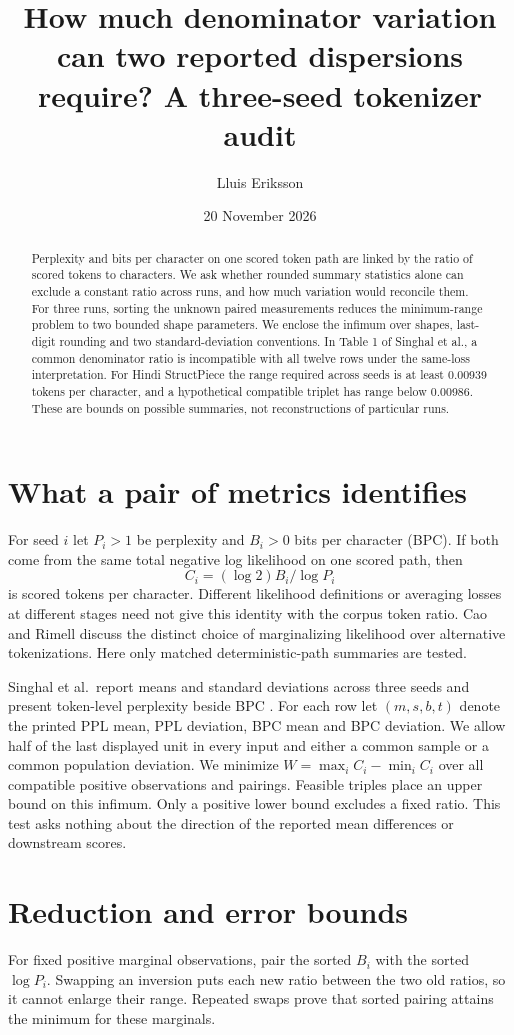 \documentclass[11pt]{article}
\title{How much denominator variation can two reported dispersions require? A three-seed tokenizer audit}
\author{Lluis Eriksson}\date{20 November 2026}
\begin{document}
\maketitle
\begin{abstract}
Perplexity and bits per character on one scored token path are linked by the ratio of scored tokens to characters. We ask whether rounded summary statistics alone can exclude a constant ratio across runs, and how much variation would reconcile them. For three runs, sorting the unknown paired measurements reduces the minimum-range problem to two bounded shape parameters. We enclose the infimum over shapes, last-digit rounding and two standard-deviation conventions. In Table 1 of Singhal et al., a common denominator ratio is incompatible with all twelve rows under the same-loss interpretation. For Hindi StructPiece the range required across seeds is at least 0.00939 tokens per character, and a hypothetical compatible triplet has range below 0.00986. These are bounds on possible summaries, not reconstructions of particular runs.
\end{abstract}
\section{What a pair of metrics identifies}
For seed $i$ let $P_i>1$ be perplexity and $B_i>0$ bits per character (BPC). If both come from the same total negative log likelihood on one scored path, then
\[
  C_i=(\log 2)B_i/\log P_i
\]
is scored tokens per character. Different likelihood definitions or averaging losses at different stages need not give this identity with the corpus token ratio. Cao and Rimell \cite{cao} discuss the distinct choice of marginalizing likelihood over alternative tokenizations. Here only matched deterministic-path summaries are tested.

Singhal et al.\ report means and standard deviations across three seeds and present token-level perplexity beside BPC \cite{article}. For each row let $(m,s,b,t)$ denote the printed PPL mean, PPL deviation, BPC mean and BPC deviation. We allow half of the last displayed unit in every input and either a common sample or a common population deviation. We minimize $W=\max_i C_i-\min_i C_i$ over all compatible positive observations and pairings. Feasible triples place an upper bound on this infimum. Only a positive lower bound excludes a fixed ratio. This test asks nothing about the direction of the reported mean differences or downstream scores.

\newpage
\section{Reduction and error bounds}
For fixed positive marginal observations, pair the sorted $B_i$ with the sorted $\log P_i$. Swapping an inversion puts each new ratio between the two old ratios, so it cannot enlarge their range. Repeated swaps prove that sorted pairing attains the minimum for these marginals.
\end{document}
